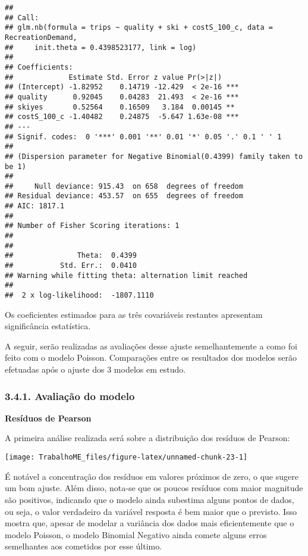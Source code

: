 \documentclass[
]{article}
\begin{document}
\begin{verbatim}
## 
## Call:
## glm.nb(formula = trips ~ quality + ski + costS_100_c, data = RecreationDemand, 
##     init.theta = 0.4398523177, link = log)
## 
## Coefficients:
##             Estimate Std. Error z value Pr(>|z|)    
## (Intercept) -1.82952    0.14719 -12.429  < 2e-16 ***
## quality      0.92045    0.04283  21.493  < 2e-16 ***
## skiyes       0.52564    0.16509   3.184  0.00145 ** 
## costS_100_c -1.40482    0.24875  -5.647 1.63e-08 ***
## ---
## Signif. codes:  0 '***' 0.001 '**' 0.01 '*' 0.05 '.' 0.1 ' ' 1
## 
## (Dispersion parameter for Negative Binomial(0.4399) family taken to be 1)
## 
##     Null deviance: 915.43  on 658  degrees of freedom
## Residual deviance: 453.57  on 655  degrees of freedom
## AIC: 1817.1
## 
## Number of Fisher Scoring iterations: 1
## 
## 
##               Theta:  0.4399 
##           Std. Err.:  0.0410 
## Warning while fitting theta: alternation limit reached 
## 
##  2 x log-likelihood:  -1807.1110
\end{verbatim}

Os coeficientes estimados para as três covariáveis restantes apresentam
significância estatística.

A seguir, serão realizadas as avaliações desse ajuste semelhantemente a
como foi feito com o modelo Poisson. Comparações entre os resultados dos
modelos serão efetuadas após o ajuste dos 3 modelos em estudo.

\subsubsection{3.4.1. Avaliação do
modelo}\label{avaliauxe7uxe3o-do-modelo-1}

\textbf{Resíduos de Pearson}

A primeira análise realizada será sobre a distribuição dos resíduos de
Pearson:

\begin{center}\texttt{[image: TrabalhoME\_files/figure-latex/unnamed-chunk-23-1]} \end{center}

É notável a concentração dos resíduos em valores próximos de zero, o que
sugere um bom ajuste. Além disso, nota-se que os poucos resíduos com
maior magnitude são positivos, indicando que o modelo ainda subestima
alguns pontos de dados, ou seja, o valor verdadeiro da variável resposta
é bem maior que o previsto. Isso mostra que, apesar de modelar a
variância dos dados mais eficientemente que o modelo Poisson, o modelo
Binomial Negativo ainda comete alguns erros semelhantes aos cometidos
por esse último.
\end{document}

